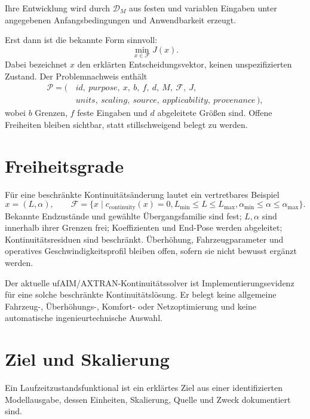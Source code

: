 \begin{definition}[Laufzeitzustandsentwicklung]
\label{def:optimization-runtime-state-evolution}
Ihre Entwicklung wird durch \(\mathcal D_M\) aus festen und variablen Eingaben
unter angegebenen Anfangsbedingungen und Anwendbarkeit erzeugt.
\end{definition}

Erst dann ist die bekannte Form sinnvoll:
\[
\min_{x\in\mathcal F}J(x).
\]
Dabei bezeichnet \(x\) den erklärten Entscheidungsvektor, keinen
unspezifizierten Zustand. Der Problemnachweis enthält
\[
\begin{aligned}
\mathcal P=(\, &id,\ purpose,\ x,\ b,\ f,\ d,\ M,\ \mathcal F,\ J,\\
              &units,\ scaling,\ source,\ applicability,\ provenance\,),
\end{aligned}
\]
wobei \(b\) Grenzen, \(f\) feste Eingaben und \(d\) abgeleitete Größen sind.
Offene Freiheiten bleiben sichtbar, statt stillschweigend belegt zu werden.

\section{Freiheitsgrade}

Für eine beschränkte Kontinuitätsänderung lautet ein vertretbares Beispiel
\[
x=(L,\alpha),\qquad
\mathcal F=\{x\mid c_{\mathrm{continuity}}(x)=0,
L_{\min}\le L\le L_{\max},
\alpha_{\min}\le\alpha\le\alpha_{\max}\}.
\]
Bekannte Endzustände und gewählte Übergangsfamilie sind fest; \(L,\alpha\)
sind innerhalb ihrer Grenzen frei; Koeffizienten und End-Pose werden
abgeleitet; Kontinuitätsresiduen sind beschränkt. Überhöhung,
Fahrzeugparameter und operatives Geschwindigkeitsprofil bleiben offen, sofern
sie nicht bewusst ergänzt werden.

Der aktuelle ufAIM/AXTRAN-Kontinuitätssolver ist Implementierungsevidenz für
eine solche beschränkte Kontinuitätslösung. Er belegt keine allgemeine
Fahrzeug-, Überhöhungs-, Komfort- oder Netzoptimierung und keine automatische
ingenieurtechnische Auswahl.

\section{Ziel und Skalierung}

\begin{definition}[Laufzeitzustandsfunktional]
\label{def:runtime-state-functional}
Ein Laufzeitzustandsfunktional ist ein erklärtes Ziel aus einer
identifizierten Modellausgabe, dessen Einheiten, Skalierung, Quelle und Zweck
dokumentiert sind.
\end{definition}

